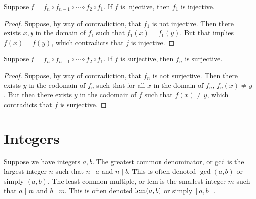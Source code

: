 \begin{theorem}\label{thm:composite-injection}
    Suppose \(f = f_n \circ f_{n-1} \circ \cdots \circ f_2 \circ f_1\).
    If \(f\) is injective, then \(f_1\) is injective.
\end{theorem}
\begin{proof}
    Suppose, by way of contradiction, that \(f_1\) is not injective.
    Then there exists \(x,y\) in the domain of \(f_1\)
    such that \(f_1(x) = f_1(y)\).
    But that implies \(f(x) = f(y)\),
    which contradicts that \(f\) is injective.
\end{proof}
\begin{theorem}\label{thm:composite-surjective}
    Suppose \(f = f_n \circ f_{n-1} \circ \cdots \circ f_2 \circ f_1\).
    If \(f\) is surjective, then \(f_n\) is surjective.
\end{theorem}
\begin{proof}
    Suppose, by way of contradiction, that \(f_n\) is not surjective.
    Then there exists \(y\) in the codomain of \(f_n\)
    such that for all \(x\) in the domain of \(f_n\),
    \(f_n(x) \neq y\).
    But then there exists \(y\) in the codomain of \(f\)
    such that \(f(x) \neq y\),
    which contradicts that \(f\) is surjective.
\end{proof}


\section{Integers}

\begin{definition}
    Suppose we have integers \(a,b\).
    The greatest common denominator, or gcd
    is the largest integer \(n\) such that \(n \mid a\) and \(n \mid b\).
    This is often denoted \(\gcd(a,b)\) or simply \((a,b)\).
    The least common multiple, or lcm
    is the smallest integer \(m\) such that \(a \mid m\) and \(b \mid m\).
    This is often denoted \(\operatorname{lcm}(a,b)\) or simply \([a,b]\).
\end{definition}

